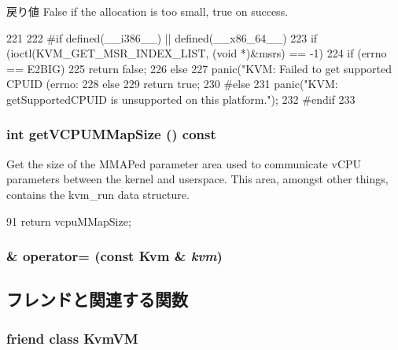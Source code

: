 \begin{DoxyReturn}{戻り値}
False if the allocation is too small, true on success. 
\end{DoxyReturn}



\begin{DoxyCode}
221 {
222 #if defined(__i386__) || defined(__x86_64__)
223     if (ioctl(KVM_GET_MSR_INDEX_LIST, (void *)&msrs) == -1) {
224         if (errno == E2BIG)
225             return false;
226         else
227             panic("KVM: Failed to get supported CPUID (errno: %
228     } else
229         return true;
230 #else
231     panic("KVM: getSupportedCPUID is unsupported on this platform.\n");
232 #endif
233 }
\end{DoxyCode}
\hypertarget{classKvm_a554cb4dd3512dba2169997c9c804d4ec}{
\subsubsection[{getVCPUMMapSize}]{\setlength{\rightskip}{0pt plus 5cm}int getVCPUMMapSize () const}}
\label{classKvm_a554cb4dd3512dba2169997c9c804d4ec}
Get the size of the MMAPed parameter area used to communicate vCPU parameters between the kernel and userspace. This area, amongst other things, contains the kvm\_\-run data structure. 


\begin{DoxyCode}
91 { return vcpuMMapSize; }
\end{DoxyCode}
\hypertarget{classKvm_a99c5e2a3a05865b3109843939909b4f6}{
\subsubsection[{operator=}]{\& operator= (const {\bf Kvm} \& {\em kvm})}}
\label{classKvm_a99c5e2a3a05865b3109843939909b4f6}


\subsection{フレンドと関連する関数}
\hypertarget{classKvm_a9210c8f6e282c397940f37aff4d6c32d}{
\subsubsection[{KvmVM}]{\setlength{\rightskip}{0pt plus 5cm}friend class {\bf KvmVM}}}
\label{classKvm_a9210c8f6e282c397940f37aff4d6c32d}


